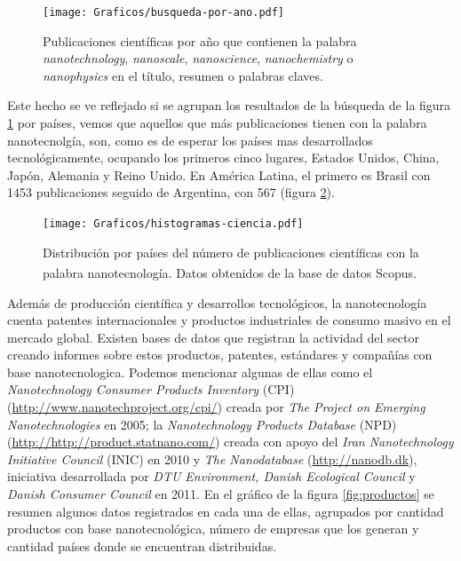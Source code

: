  			\begin{figure}[ht!]
 			\begin{center}
 			\hspace{0.3cm}\texttt{[image: Graficos/busqueda-por-ano.pdf]}
 			\vspace*{-0.6cm}
 			\caption[Publicaciones por año en nanotecnología]{Publicaciones científicas por año que contienen la palabra \textit{nanotechnology}, \textit{nanoscale}, \textit{nanoscience}, \textit{nanochemistry} o \textit{nanophysics} en el título, resumen o palabras claves.}
 			\label{fig:publicaciones-ano}
 			\vspace*{-0.2cm} 		    
 			\end{center}
 		    \end{figure}

	 Este hecho se ve reflejado si se agrupan los resultados de la búsqueda de la figura \ref{fig:publicaciones-ano} por países, vemos que aquellos que más publicaciones tienen con la palabra nanotecnolgía, son, como es de esperar los países mas desarrollados tecnológicamente, ocupando los primeros cinco lugares, Estados Unidos, China, Japón, Alemania y Reino Unido. En América Latina, el primero es Brasil con 1453 publicaciones seguido de Argentina, con 567 (figura \ref{fig:paises}).

			\begin{figure}[b!]
 				\begin{center}
 				\texttt{[image: Graficos/histogramas-ciencia.pdf]}
 				\vspace*{-0.4cm}
 				\caption[Nanotecnología por países]{Distribución por países del número de publicaciones científicas con la palabra nanotecnología. Datos obtenidos de la base de datos Scopus\textsuperscript\textregistered.}
 				\label{fig:paises}
 		    	\end{center}
 		    	\end{figure}

	 Además de producción científica y desarrollos tecnológicos, la nanotecnología cuenta patentes internacionales y productos industriales de consumo masivo en el mercado global. Existen bases de datos que registran la actividad del sector creando informes sobre estos productos, patentes, estándares y compañías con base nanotecnologica. Podemos mencionar algunas de ellas como el \textit{Nanotechnology Consumer Products Inventory} (CPI) (\url{http://www.nanotechproject.org/cpi/}) creada por \textit{The Project on Emerging Nanotechnologies} en 2005\cite{Vance2015}; la \textit{Nanotechnology Products Database} (NPD) (\url{http://http://product.statnano.com/}) creada con apoyo del \textit{Iran Nanotechnology Initiative Council} (INIC) en 2010 y \textit{The Nanodatabase} (\url{http://nanodb.dk}), iniciativa desarrollada por \textit{DTU Environment, Danish Ecological Council} y \textit{Danish Consumer Council} en 2011. En el gráfico de la figura \ref{fig:productos} se resumen algunos datos registrados en cada una de ellas, agrupados por cantidad productos con base nanotecnológica, número de empresas que los generan y cantidad países donde se encuentran distribuidas.

